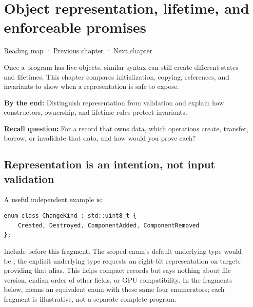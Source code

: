 \chapter{Object representation, lifetime, and enforceable promises}\label{05-engine-i-ch003-object-representation-lifetime-and-enforceable-promises}\hypertarget{05-engine-i-ch003}{}\label{stagechapter:05-engine-i-ch003}

\hypertarget{05-engine-i-ch003-object-representation-lifetime-and-enforceable-promises}{}

\hyperref[volume-reading-map]{Reading map} · \hyperref[05-engine-i-ch002-how-bytes-become-programs-objects-and-resource-references]{Previous chapter} · \hyperref[05-engine-i-ch004-resource-ownership-failure-paths-and-review-practice]{Next chapter}

Once a program has live objects, similar syntax can still create different states and lifetimes. This chapter compares initialization, copying, references, and invariants to show when a representation is safe to expose.

\textbf{By the end:} Distinguish representation from validation and explain how constructors, ownership, and lifetime rules protect invariants.

\textbf{Recall question:} For a record that owns data, which operations create, transfer, borrow, or invalidate that data, and how would you prove each?

\section{Representation is an intention, not input validation}\label{05-engine-i-ch003-representation-is-an-intention-not-input-validation}

\hypertarget{05-engine-i-ch003-representation-is-an-intention-not-input-validation}{}

A useful independent example is:

\begin{verbatim}
enum class ChangeKind : std::uint8_t {
    Created, Destroyed, ComponentAdded, ComponentRemoved
};
\end{verbatim}

Include  before this fragment. The scoped enum's default underlying type would be ; the explicit underlying type requests an eight-bit representation on targets providing that alias. This helps compact records but says nothing about file version, endian order of other fields, or GPU compatibility. In the fragments below,  means an equivalent enum with these same four enumerators; each fragment is illustrative, not a separate complete program.

